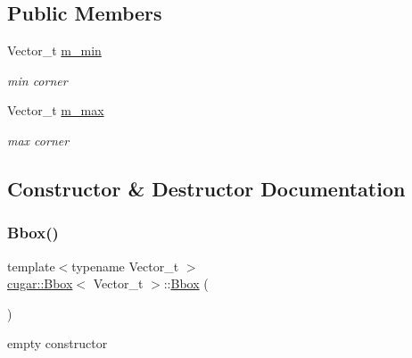 \subsection*{Public Members}
\begin{DoxyCompactItemize}
\item 
\mbox{\label{structcugar_1_1_bbox_a8e9be3ebb17db93470a1443743dae7a2}} 
Vector\+\_\+t \hyperlink{structcugar_1_1_bbox_a8e9be3ebb17db93470a1443743dae7a2}{m\+\_\+min}
\begin{DoxyCompactList}\small\item\em min corner \end{DoxyCompactList}\item 
\mbox{\label{structcugar_1_1_bbox_a418b5a7064cbae88f24ee39551a094e7}} 
Vector\+\_\+t \hyperlink{structcugar_1_1_bbox_a418b5a7064cbae88f24ee39551a094e7}{m\+\_\+max}
\begin{DoxyCompactList}\small\item\em max corner \end{DoxyCompactList}\end{DoxyCompactItemize}


\subsection{Constructor \& Destructor Documentation}
\mbox{\label{structcugar_1_1_bbox_a06de7036f86e3f0d4784affe7da5a60c}} 
\subsubsection{\texorpdfstring{Bbox()}{Bbox()}\hspace{0.1cm}{\footnotesize\ttfamily [1/5]}}
{\footnotesize\ttfamily template$<$typename Vector\+\_\+t $>$ \\
\hyperlink{structcugar_1_1_bbox}{cugar\+::\+Bbox}$<$ Vector\+\_\+t $>$\+::\hyperlink{structcugar_1_1_bbox}{Bbox} (\begin{DoxyParamCaption}{ }\end{DoxyParamCaption})}

empty constructor \mbox{\label{structcugar_1_1_bbox_a228ae5e963feec2886d7e0475cc63940}} 
